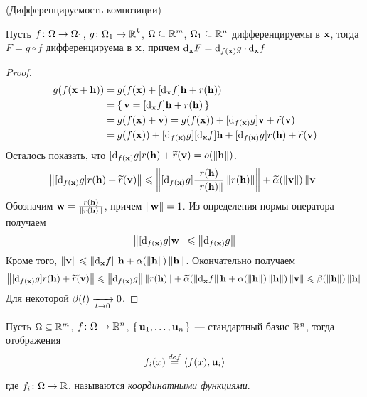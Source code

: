 \begin{theorem}(Дифференцируемость композиции)

    Пусть $f \colon \O \to \O_{1}$, $g \colon \O_{1} \to \Rk$, $\O \subseteq
    \Rm$, $\O_{1} \subseteq \Rn$ дифференцируемы в $\x$, тогда $F = g \circ f$
    дифференцируема в $\x$, причем $\der{F}{\x} = \der{g}{f(\x)} \cdot
    \der{f}{\x}$
\end{theorem}
\begin{proof}
    \begin{align*}
        g(f(\x + \h)) &= g(f(\x) + [\der{f}{\x}]\h + r(\h)) \\
        &= \{\, \v = [\der{f}{\x}]\h + r(\h) \,\} \\
        &= g(f(\x) + \v) = g(f(\x)) + [\der{g}{f(\x)}]\v + \widetilde{r}(\v) \\
        &= g(f(\x)) + [\der{g}{f(\x)}][\der{f}{\x}]\h + [\der{g}{f(\x)}]r(\h) +
        \widetilde{r}(\v) \\
    \end{align*}
    Осталось показать, что $[\der{g}{f(\x)}]r(\h) + \widetilde{r}(\v) =
    o(\norm{\h})$.
\[
    \norm{[\der{g}{f(\x)}]r(\h) + \widetilde{r}(\v)} \leqslant
    \norm{[\der{g}{f(\x)}]\frac{r(\h)}{\norm{r(\h)}}\norm{r(\h)}} +
    \widetilde{\a}(\norm{\v})\norm{\v}
\]
    Обозначим $\w = \frac{r(\h)}{\norm{r(\h)}}$, причем $\norm{\w} = 1$.
    Из определения нормы оператора получаем
\[
    \norm{[\der{g}{f(\x)}]\w} \leqslant \norm{\der{g}{f(\x)}}
\]
    Кроме того, $\norm{\v} \leqslant \norm{\der{f}{\x}}\h +
    \a(\norm{\h})\norm{\h}$. Окончательно получаем
\[
    \norm{[\der{g}{f(\x)}]r(\h) + \widetilde{r}(\v)} \leqslant
    \norm{\der{g}{f(\x)}}\norm{r(\h)} + \widetilde{\a}(\norm{\der{f}{\x}}\h +
    \a(\norm{\h})\norm{\h})\norm{\v} \leqslant \b(\norm{\h})\norm{\h}
\]
    Для некоторой $\b(t) \xrightarrow[t \to 0]{} 0$.
\end{proof}

\begin{definition}
    Пусть $\O \subseteq \Rm$, $f \colon \O \to \Rn$, $\{\, \elemvec{u}_1, \ldots,
    \elemvec{u}_n \,\}$ --- стандартный базис $\Rn$, тогда отображения
\[
    f_i(x) \defeq \langle f(x), \elemvec{u}_i \rangle
\]
    где $f_i \colon \O \to \R$, называются \textit{координатными функциями}.
\end{definition}

